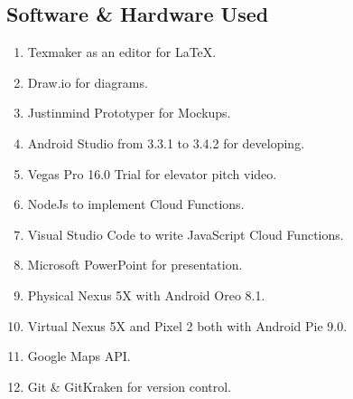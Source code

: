 \subsection{Software \& Hardware Used}
\begin{enumerate}
\item Texmaker as an editor for \LaTeX.
\item Draw.io for diagrams.
\item Justinmind Prototyper for Mockups.
\item Android Studio from 3.3.1 to 3.4.2 for developing.
\item Vegas Pro 16.0 Trial for elevator pitch video.
\item NodeJs to implement Cloud Functions.
\item Visual Studio Code to write JavaScript Cloud Functions.
\item Microsoft PowerPoint for presentation.
\item Physical Nexus 5X with Android Oreo 8.1.
\item Virtual Nexus 5X and Pixel 2 both with Android Pie 9.0.
\item Google Maps API.
\item Git \& GitKraken for version control.
\end{enumerate}